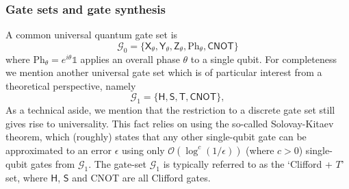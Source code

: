 \documentclass[aip,apr,twocolumn,showpacs,superscriptaddress,groupedaddress,nofootinbib,reprint]{revtex4-1}  %
\newcommand{\X}[1]{\textsf{X}_{#1}}
\newcommand{\Y}[1]{\textsf{Y}_{#1}}
\newcommand{\Z}[1]{\textsf{Z}_{#1}}
\newcommand{\T}{\textsf{T}}
\renewcommand{\S}{\textsf{S}}
\renewcommand{\H}{\textsf{H}}
\newcommand{\CNOT}{\textsf{CNOT}}
\begin{document}
\subsubsection{\label{sec:gatesetgatesynth}Gate sets and gate synthesis}
A common universal quantum gate set is
\begin{equation}
\mathcal G_0 = \{\X{\theta},\Y{\theta},\Z{\theta},\text{Ph}_\theta,\CNOT{}\}
\end{equation}
where Ph$_\theta = e^{i\theta} \mathds{1}$ applies an overall phase $\theta$ to a single qubit. For completeness we mention another universal gate set which is of particular interest from a theoretical perspective, namely
\begin{equation}
\mathcal G_1 = \{\H, \S, \T, \CNOT{}\},
\end{equation}
As a technical aside, we mention that the restriction to a discrete gate set still gives rise to universality. This fact relies on using the so-called Solovay-Kitaev\cite{Kitaev1997,Dawson2006} theorem, which (roughly) states that any other single-qubit gate can be approximated to an error $\epsilon$ using only $\mathcal O(\log^c (1/\epsilon))$ (where $c>0$) single-qubit gates from $\mathcal G_1$. The gate-set $\mathcal{G}_1$ is typically referred to as the `Clifford + $T$' set, where $\H$, $\S$ and \CNOT{} are all Clifford gates.
\end{document}
